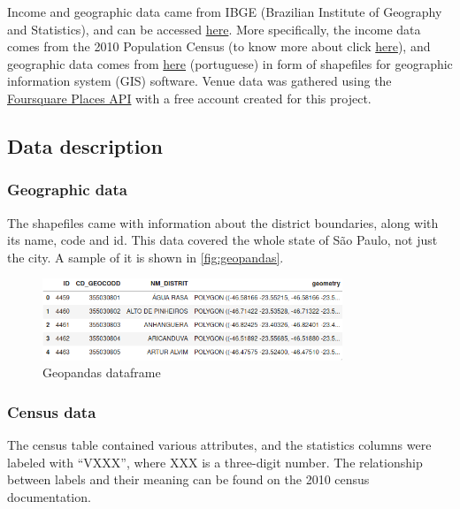 \documentclass[12pt]{article}
\begin{document}
Income and geographic data came from IBGE (Brazilian Institute of Geography and
Statistics), and can be accessed
\href{https://www.ibge.gov.br/en/home-eng.html}{here}. More specifically, the
income data comes from the 2010 Population Census (to know more about click
\href{https://www.ibge.gov.br/en/statistics/social/income-expenditure-and-consumption/18391-2010-population-census.html?=&t=o-que-e}{here}),
and geographic data comes from
\href{https://www.ibge.gov.br/geociencias/organizacao-do-territorio/malhas-territoriais/26565-malhas-de-setores-censitarios-divisoes-intramunicipais.html?=&t=o-que-e}{here}
(portuguese) in form of shapefiles for geographic information system (GIS)
software.  Venue data was gathered using the
\href{https://developer.foursquare.com/places}{Foursquare Places API} with a
free account created for this project.

\subsection{Data description}

\subsubsection{Geographic data}

The shapefiles came with information about the district boundaries, along with
its name, code and id. This data covered the whole state of São Paulo, not just
the city. A sample of it is shown in \autoref{fig:geopandas}.

\begin{figure}[h]
        \centering
        \includegraphics[width=0.8\textwidth]{geopandas.png}
        \caption{Geopandas dataframe\label{fig:geopandas}}
\end{figure}

\subsubsection{Census data}

The census table contained various attributes, and the statistics columns were
labeled with ``VXXX'', where XXX is a three-digit number. The relationship
between labels and their meaning can be found on the 2010 census documentation.
\end{document}
